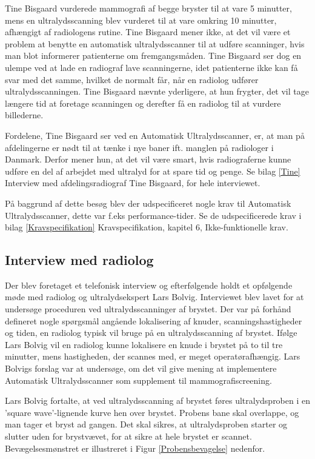 Tine Bisgaard vurderede mammografi af begge bryster til at vare 5 minutter, mens en ultralydsscanning blev vurderet til at vare omkring 10 minutter, afhængigt af radiologens rutine. Tine Bisgaard mener ikke, at det vil være et problem at benytte en automatisk ultralydsscanner til at udføre scanninger, hvis man blot informerer patienterne om fremgangsmåden. Tine Bisgaard ser dog en ulempe ved at lade en radiograf lave scanningerne, idet patienterne ikke kan få svar med det samme, hvilket de normalt får, når en radiolog udfører ultralydsscanningen. Tine Bisgaard nævnte yderligere, at hun frygter, det vil tage længere tid at foretage scanningen og derefter få en radiolog til at vurdere billederne.

Fordelene, Tine Bisgaard ser ved en Automatisk Ultralydsscanner, er, at man på afdelingerne er nødt til at tænke i nye baner ift. manglen på radiologer i Danmark. Derfor mener hun, at det vil være smart, hvis radiograferne kunne udføre en del af arbejdet med ultralyd for at spare tid og penge. Se bilag \ref{Tine} Interview med afdelingsradiograf Tine Bisgaard, for hele interviewet. 

På baggrund af dette besøg blev der udspecificeret nogle krav til Automatisk Ultralydsscanner, dette var f.eks performance-tider. Se de udspecificerede krav i bilag \ref{Kravspecifikation} Kravspecifikation, kapitel 6, Ikke-funktionelle krav. 

\subsection*{Interview med radiolog}
Der blev foretaget et telefonisk interview og efterfølgende holdt et opfølgende møde med radiolog og ultralydsekspert Lars Bolvig. Interviewet blev lavet for at undersøge proceduren ved ultralydsscanninger af brystet. Der var på forhånd defineret nogle spørgsmål angående lokalisering af knuder, scanningshastigheder og tiden, en radiolog typisk vil bruge på en ultralydsscanning af brystet. Ifølge Lars Bolvig vil en radiolog kunne lokalisere en knude i brystet på to til tre minutter, mens hastigheden, der scannes med, er meget operatørafhængig. Lars Bolvigs forslag var at undersøge, om det vil give mening at implementere Automatisk Ultralydsscanner som supplement til mammografiscreening. 

Lars Bolvig fortalte, at ved ultralydsscanning af brystet føres ultralydsproben i en 'square wave'-lignende kurve hen over brystet. Probens bane skal overlappe, og man tager et bryst ad gangen. Det skal sikres, at ultralydsproben starter og slutter uden for brystvævet, for at sikre at hele brystet er scannet. Bevægelsesmønstret er illustreret i Figur \ref{Probensbevagelse} nedenfor. 


